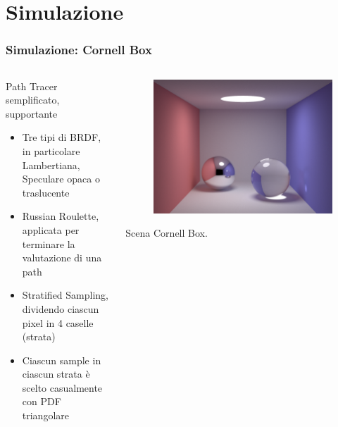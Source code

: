 \documentclass[14pt, aspectratio=169]{beamer}
\theoremstyle{theoremdd}
\begin{document}
	
	\section{Simulazione}
	\begin{frame}\frametitle{Simulazione: Cornell Box}
		\begin{columns}
			\begin{column}{0.6\textwidth}
				Path Tracer semplificato, supportante
				\begin{itemize}[topsep=0.1pt,noitemsep]
				\item[\bullet] Tre tipi di BRDF, in particolare Lambertiana, Speculare opaca o traslucente
				\item[\bullet] \textsf{Russian Roulette}, applicata per terminare la valutazione di una path
				\item[\bullet] \textsf{Stratified Sampling}, dividendo ciascun pixel in 4 caselle (strata)
				\item[\bullet] Ciascun sample in ciascun strata è scelto casualmente con PDF triangolare
				\end{itemize}
			\end{column}
			\begin{column}{0.4\textwidth}
				\begin{figure}[t]
					\centering
					\includegraphics[width=\textwidth]{../assets/appendixD_result_25k.png}
				\end{figure}
				Scena \textsf{Cornell Box}.
			\end{column}
		\end{columns}
	\end{frame}
\end{document}
